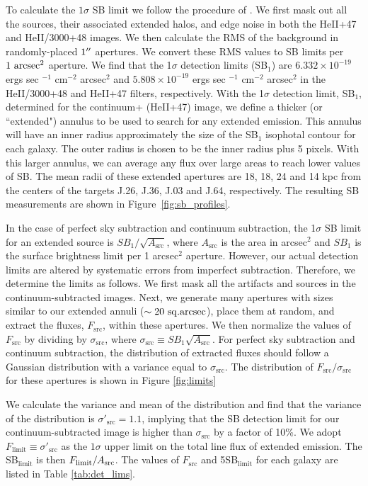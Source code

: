 \documentclass[twocolumn]{aastex62}
\begin{document}
To calculate the $1\sigma$ SB limit we follow the procedure of \cite{Battaia_2015}. We first mask out all the sources, their associated extended halos, and edge noise in both the HeII+47 and HeII/3000+48 images. We then calculate the RMS of the background in randomly-placed $1\mbox{$^{\prime\prime}$}$ apertures. We convert these RMS values to SB limits per $1~\rm arcsec^2$  aperture. We find that the 1$\sigma$ detection limits (SB$_1$) are $6.332\times10^{-19}$ ergs sec $^{-1}$ cm$^{-2}$ arcsec$^2$ and $5.808\times10^{-19} $ ergs sec $^{-1}$ cm$^{-2}$ arcsec$^2$ in the HeII/3000+48 and HeII+47 filters, respectively. 
With the 1$\sigma$ detection limit, SB$_1$, determined for the continuum+ (HeII+47) image, we define a thicker (or ``extended") annulus to be used to search for any extended  emission. This annulus will have an inner radius approximately the size of the SB$_1$ isophotal contour for each galaxy. The outer radius is chosen to be the inner radius plus 5 pixels. With this larger annulus, we can average any flux over large areas to reach lower values of SB. The mean radii of these extended apertures are 18, 18, 24 and 14 kpc from the centers of the targets J.26, J.36, J.03 and J.64, respectively. The resulting SB measurements are shown in Figure~\ref{fig:sb_profiles}.

In the case of perfect sky subtraction and continuum subtraction, the 1$\sigma$ SB limit for an extended source is $SB_{1}/\sqrt{A_\text{src}}$, where $A_\text{src}$ is the area in arcsec$^2$ and $SB_{1}$ is the surface brightness limit per 1 arcsec$^2$ aperture. However, our actual detection limits are altered by systematic errors from imperfect subtraction. Therefore, we determine the limits as follows. 
We first mask all the artifacts and sources in the continuum-subtracted images. Next, we generate many apertures with sizes similar to our extended annuli ($\sim 20 \rm\ sq.arcsec$), place them at random, and extract the fluxes, $F_{\text{src}}$, within these apertures. We then normalize the values of $F_{\text{src}}$ by dividing by $\sigma_{\text{src}}$, where $\sigma_{\text{src}} \equiv SB_{1}\sqrt{A_\text{src}}$. For perfect sky subtraction and continuum subtraction, the distribution of extracted fluxes should follow a Gaussian distribution with a variance equal to $\sigma_{\text{src}}$. The distribution of $F_{\text{src}}/\sigma_{\text{src}}$ for these apertures is shown in Figure \ref{fig:limits}

We calculate the variance and mean of the distribution and find that the variance of the distribution is $\sigma'_{\text{src}}=1.1$, implying that the SB detection limit for our continuum-subtracted image is higher than $\sigma_{\text{src}}$ by a factor of 10\%. We adopt $F_{\text{limit}} \equiv \sigma'_{\text{src}}$  as the $1 \sigma$ upper limit on the total line flux of extended  emission. The SB$_{\text{limit}}$ is then $F_{\text{limit}}/A_{\rm{src}}$. The values of $F_{\text{src}}$ and 5SB$_{\text{limit}}$ for each galaxy are listed in Table \ref{tab:det_lims}.
\end{document}
